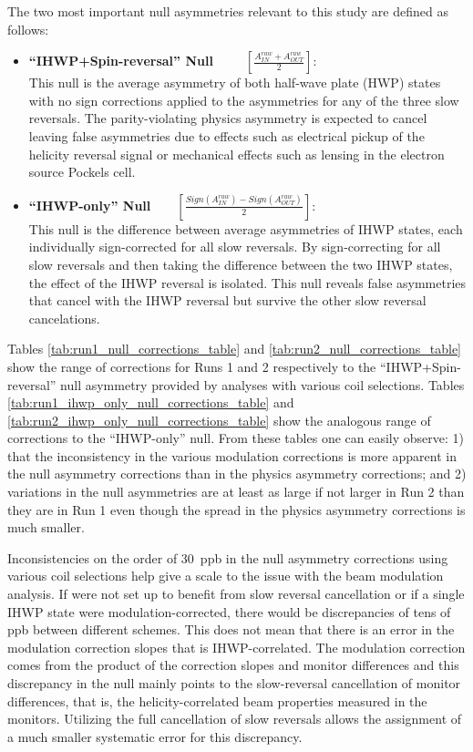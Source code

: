 The two most important null asymmetries relevant to this study are defined as follows:
\begin{itemize}
\item{{\bf ``IHWP+Spin-reversal'' Null}~~~~~$\left[\frac{A_{IN}^{raw}+A_{OUT}^{raw}}{2}\right]$:\\ This null is the average asymmetry of both half-wave plate (HWP) states with no sign corrections applied to the asymmetries for any of the three slow reversals. The parity-violating physics asymmetry is expected to cancel leaving false asymmetries due to effects such as electrical pickup of the helicity reversal signal or mechanical effects such as lensing in the electron source Pockels cell. }
\item{{\bf ``IHWP-only'' Null}~~~~$\left[\frac{Sign(A_{IN}^{raw})-Sign(A_{OUT}^{raw})}{2}\right]$:\\ This null is the difference between average asymmetries of IHWP states, each individually sign-corrected for all slow reversals. By sign-correcting for all slow reversals and then taking the difference between the two IHWP states, the effect of the IHWP reversal is isolated. This null reveals false asymmetries that cancel with the IHWP reversal but survive the other slow reversal cancelations.}
\end{itemize}

Tables \ref{tab:run1_null_corrections_table} and \ref{tab:run2_null_corrections_table} show the range of corrections for Runs 1 and 2 respectively to the ``IHWP+Spin-reversal'' null asymmetry provided by analyses with various coil selections. Tables \ref{tab:run1_ihwp_only_null_corrections_table} and \ref{tab:run2_ihwp_only_null_corrections_table} show the analogous range of corrections to the ``IHWP-only'' null. From these tables one can easily observe: 1) that the inconsistency in the various modulation corrections is more apparent in the null asymmetry corrections than in the physics asymmetry corrections; and 2) variations in the null asymmetries are at least as large if not larger in Run 2 than they are in Run 1 even though the spread in the physics asymmetry corrections is much smaller.

Inconsistencies on the order of 30~ppb in the null asymmetry corrections using various coil selections help give a scale to the issue with the beam modulation analysis. If \Qs were not set up to benefit from slow reversal cancellation or if a single IHWP state were modulation-corrected, there would be discrepancies of tens of ppb between different schemes. This does not mean that there is an error in the modulation correction slopes that is IHWP-correlated. The modulation correction comes from the product of the correction slopes and monitor differences and this discrepancy in the null mainly points to the slow-reversal cancellation of monitor differences, that is, the helicity-correlated beam properties measured in the monitors. Utilizing the full cancellation of slow reversals allows the assignment of a much smaller systematic error for this discrepancy.


